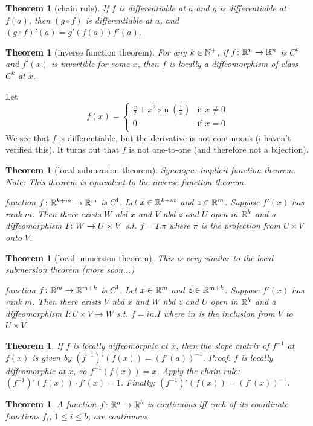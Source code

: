 \documentclass[11pt]{amsbook}
\theoremstyle{mystyle} %
\newtheorem{thrm}[thm]{Theorem}
\numberwithin{thm}{section}
\begin{document}
\begin{thrm}[chain rule]
	If $f$ is differentiable at $a$ and $g$ is differentiable at $f(a)$, then $(g \circ f)$ is differentiable at $a$, and $(g \circ f)'(a) = g'(f(a))f'(a)$.
\end{thrm}
\begin{thrm}[inverse function theorem]
	For any $k \in {\mathbb N}^+$, if $f\colon {\mathbb R}^n \to {\mathbb R}^n$ is $C^k$ and $f'(x)$ is invertible for some $x$, then $f$ is locally a diffeomorphism of class $C^k$ at $x$.
\end{thrm}
\begin{example}
	Let $$f(x) =
	\begin{cases}
		\frac{x}{2} + x^2\sin\left(\frac 1x\right)	&\text{if $x \neq 0$} \\
		0											&\text{if $x=0$} \\
	\end{cases}
	$$  We see that $f$ is differentiable, but the derivative is not continuous (i haven't verified this).  It turns out that $f$ is not one-to-one (and therefore not a bijection).
\end{example}
\begin{thrm}[local submersion theorem]
	Synonym: implicit function theorem.
	Note: This theorem is equivalent to the inverse function theorem.

	function $f \colon {\mathbb R}^{k+m} \to {\mathbb R}^m$ is $C^1$.
	Let $x \in {\mathbb R}^{k+m}$ and $z \in {\mathbb R}^m$.
	Suppose $f'(x)$ has rank $m$.
	Then there exists $W$ nbd $x$ and $V$ nbd $z$ and $U$ open in ${\mathbb R}^k$ and a diffeomorphism $I \colon W \to U \times V$
	s.t. $f = I.\pi$ where $\pi$ is the projection from $U \times V$ onto $V$.
\end{thrm}
\begin{thrm}[local immersion theorem]
	This is very similar to the local submersion theorem (more soon...)

	function $f \colon {\mathbb R}^{m} \to {\mathbb R}^{m+k}$ is $C^1$.
	Let $x \in {\mathbb R}^{m}$ and $z \in {\mathbb R}^{m+k}$.
	Suppose $f'(x)$ has rank $m$.
	Then there exists $V$ nbd $x$ and $W$ nbd $z$ and $U$ open in ${\mathbb R}^k$ and a diffeomorphism $I : U \times V \to W$
	s.t. $f = in.I$ where $in$ is the inclusion from $V$ to $U \times V$.
\end{thrm}
\begin{thrm}
	If $f$ is locally diffeomorphic at $x$, then the slope matrix of $f^{-1}$ at $f(x)$ is given by $(f^{-1})'(f(x)) = (f'(a))^{-1}$.
	Proof. $f$ is locally diffeomorphic at $x$, so $f^{-1}(f(x)) = x$.
	Apply the chain rule: $(f^{-1})'(f(x)) \cdot f'(x) = 1$.
	Finally: $(f^{-1})'(f(x)) = (f'(x))^{-1}$.
\end{thrm}
\begin{thrm}
	A function $f \colon {\mathbb R}^a \to {\mathbb R}^b$ is continuous iff each of its coordinate functions $f_i$, $1\leq i \leq b$, are continuous.
\end{thrm}
\end{document}
